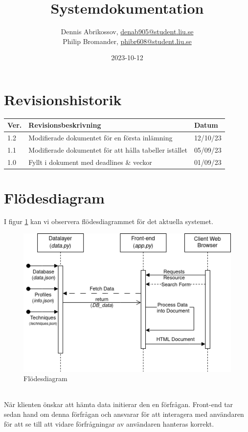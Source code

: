 \documentclass{liu_mall}
\author{Dennis Abrikossov, \url{denab905@student.liu.se}\\
  Philip Bromander, \url{phibr608@student.liu.se}}
\title{Systemdokumentation}
\date{2023-10-12}
\begin{document}
    \projectpage
    \section{Revisionshistorik}
        \begin{table}[!h]
            \begin{tabularx}{\linewidth}{|l|X|l|}
                \hline
                Ver. & Revisionsbeskrivning & Datum \\\hline
                1.2 & Modifierade dokumentet för en första inlämning & 12/10/23\\\hline
                1.1 & Modifierade dokumentet för att hålla tabeller istället & 05/09/23\\\hline
                1.0 & Fyllt i dokument med deadlines \& veckor & 01/09/23\\\hline
            \end{tabularx}
        \end{table}

    \newpage
    \section{Flödesdiagram}
        I figur \ref{fig:Data Flow Diagram} kan vi observera flödesdiagrammet för det aktuella systemet.
        \begin{figure}[h!]
            \centering
            \includegraphics{TDP003 Diagram}
            \caption{Flödesdiagram}
            \label{fig:Data Flow Diagram}
        \end{figure}\\
        När klienten önskar att hämta data initierar den en förfrågan.
        Front-end tar sedan hand om denna förfrågan och ansvarar för att interagera med användaren för att se till att vidare förfrågningar av användaren hanteras korrekt.
\end{document}

